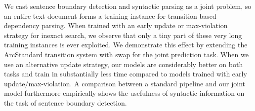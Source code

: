 We cast sentence boundary detection and syntactic parsing as a joint problem, so an entire text document forms a training instance for transition-based dependency parsing.  When trained with an early update or max-violation strategy for inexact search, we observe that only a tiny part of these very long training instances is ever exploited. We demonstrate this effect by extending the ArcStandard transition system with swap for the joint prediction task. When we use an alternative update strategy, our models are considerably better on both tasks and train in substantially less time compared to models trained with early update/max-violation.  A comparison between a standard pipeline and our joint model furthermore empirically shows the usefulness of syntactic information on the task of sentence boundary detection.
